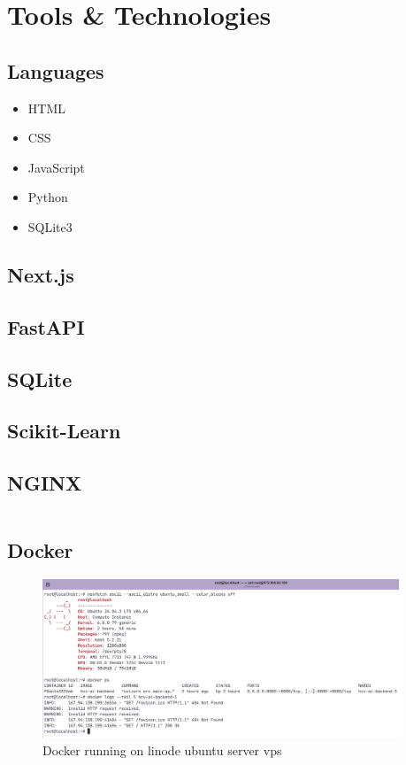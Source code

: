 \section{Tools \& Technologies}
\subsection*{Languages}
\begin{itemize}
  \item HTML
  \item CSS 
  \item JavaScript 
  \item Python
  \item SQLite3

\end{itemize}
\subsection*{Next.js}
\subsection*{FastAPI}
\subsection*{SQLite}
\subsection*{Scikit-Learn}
\subsection*{NGINX}
\inputminted[fontsize=\footnotesize]{ini}{./codes/nginx.conf}

\subsection*{Docker}

\begin{figure}[htbp]
  \begin{center}
    \includegraphics[width=0.95\textwidth]{figures/docker_public_ip.png}
  \end{center}
  \caption{Docker running on linode ubuntu server vps}\label{fig:}
\end{figure}


